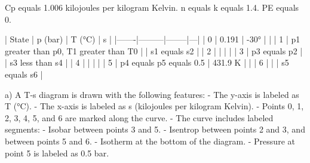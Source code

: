 Cp equals 1.006 kilojoules per kilogram Kelvin.  
n equals k equals 1.4.  
PE equals 0.  

| State | p (bar) | T (°C) | s |  
|-------|---------|--------|---|  
| 0     | 0.191   | -30°   |   |  
| 1     | p1 greater than p0, T1 greater than T0 |   | s1 equals s2 |  
| 2     |         |        |   |  
| 3     | p3 equals p2 |   | s3 less than s4 |  
| 4     |         |        |   |  
| 5     | p4 equals p5 equals 0.5 | 431.9 K |   |  
| 6     |         |        | s5 equals s6 |  

a)  
A T-s diagram is drawn with the following features:  
- The y-axis is labeled as T (°C).  
- The x-axis is labeled as s (kilojoules per kilogram Kelvin).  
- Points 0, 1, 2, 3, 4, 5, and 6 are marked along the curve.  
- The curve includes labeled segments:  
  - Isobar between points 3 and 5.  
  - Isentrop between points 2 and 3, and between points 5 and 6.  
  - Isotherm at the bottom of the diagram.  
- Pressure at point 5 is labeled as 0.5 bar.